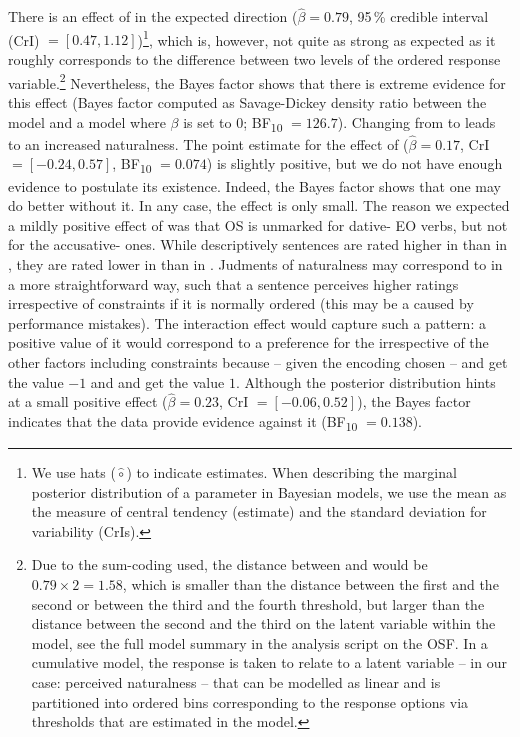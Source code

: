 \documentclass[output=paper,colorlinks,citecolor=brown]{langscibook}
\begin{document}
There is an effect of  in the expected direction ($\hat{\beta} = 0.79$, 95\,\% credible interval (CrI) $= [0.47, 1.12]$)\footnote{We use hats ($\hat{\circ}$) to indicate estimates. When describing the marginal posterior distribution of a parameter in Bayesian models, we use the mean as the measure of central tendency (estimate) and the standard deviation for variability (CrIs).}, which is, however, not quite as strong as expected as it roughly corresponds to the difference between two levels of the ordered response variable.\footnote{Due to the sum-coding used, the distance between  and  would be $0.79\times 2 = 1.58$, which is smaller than the distance between the first and the second or between the third and the fourth threshold, but larger than the distance between the second and the third on the latent variable within the model, see the full model summary in the analysis script on the OSF. In a cumulative model, the response is taken to relate to a latent variable -- in our case: perceived naturalness -- that can be modelled as linear and is partitioned into ordered bins corresponding to the response options via thresholds that are estimated in the model.}
Nevertheless, the Bayes factor shows that there is extreme evidence for this effect (Bayes factor computed as Savage-Dickey density ratio between the model and a model where $\beta$ is set to 0; BF\textsubscript{10} $=126.7$).
Changing from  to  leads to an increased naturalness.
The point estimate for the effect of  ($\hat{\beta} = 0.17$, CrI $= [-0.24, 0.57]$, BF\textsubscript{10} $=0.074$) is slightly positive, but we do not have enough evidence to postulate its existence. 
Indeed, the Bayes factor shows that one may do better without it. 
In any case, the effect is only small.
The reason we expected a mildly positive effect of  was that OS is unmarked for dative- EO verbs, but not for the accusative- ones.
While descriptively sentences are rated higher in  than in , they are rated lower in  than in .
Judments of naturalness may correspond to  in a more straightforward way, such that a sentence perceives higher ratings irrespective of  constraints if it is normally ordered (this may be a caused by performance mistakes).
The interaction effect would capture such a pattern: a positive value of it would correspond to a preference for the  irrespective of the other factors including  constraints because -- given the encoding chosen --  and  get the value $-1$ and  and  get the value $1$. 
Although the posterior distribution hints at a small positive effect ($\hat{\beta} = 0.23$, CrI $= [-0.06, 0.52]$), the Bayes factor indicates that the data provide evidence against it (BF\textsubscript{10} $=0.138$).
\end{document}
